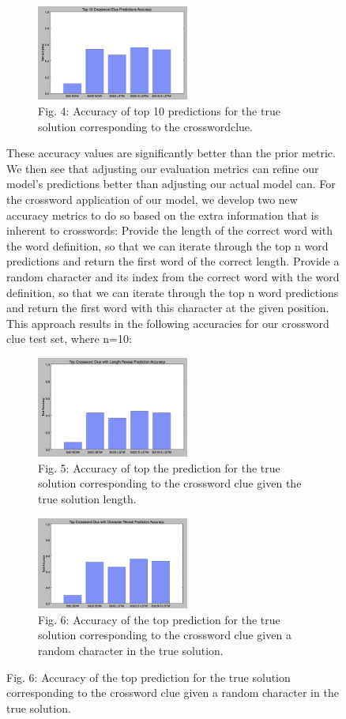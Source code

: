 \documentclass{article} %
\begin{document}
\begin{figure}
\begin{figure}
    \centering
	\includegraphics[width=50mm]{top10cross.png}
	\caption{Fig. 4: Accuracy of top 10 predictions for the true solution corresponding to the crosswordclue.}
\end{figure}

These accuracy values are significantly better than the prior metric. We then see that adjusting our evaluation metrics can refine our model’s predictions better than adjusting our actual model can. For the crossword application of our model, we develop two new accuracy metrics to do so based on the extra information that is inherent to crosswords:
Provide the length of the correct word with the word definition, so that we can iterate through the top n word predictions and return the first word of the correct length.
Provide a random character and its index from the correct word with the word definition, so that we can iterate through the top n word predictions and return the first word with this character at the given position. 
This approach results in the following accuracies for our crossword clue test set, where n=10:

\begin{figure}
    \centering
	\includegraphics[width=50mm]{top10len.png}
	\caption{Fig. 5: Accuracy of top the prediction for the true solution corresponding to the crossword clue given the true solution length.}
\end{figure}

\begin{figure}
    \centering
	\includegraphics[width=50mm]{top10char.png}
	\caption{Fig. 6: Accuracy of the top prediction for the true solution corresponding to the crossword clue given a random character in the true solution.}
\end{figure}


\end{figure}
\end{document}
